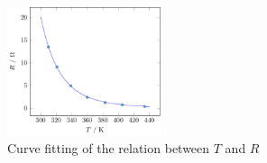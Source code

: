 \documentclass[hyperref, a4paper]{article}
\begin{document}
\begin{figure}
    \centering
    \includegraphics[width=0.4\textwidth]{plots/resistance-fitting-2.pdf}
    \caption{Curve fitting of the relation between $T$ and $R$}
    \label{fig:curve-fitting}
\end{figure}
\end{document}
